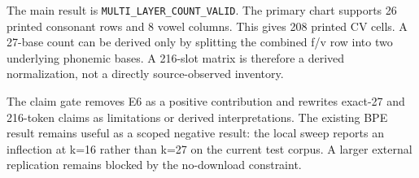 



The main result is \texttt{MULTI\_LAYER\_COUNT\_VALID}. The primary chart supports 26 printed consonant rows and 8 vowel columns. This gives 208 printed CV cells. A 27-base count can be derived only by splitting the combined f/v row into two underlying phonemic bases. A 216-slot matrix is therefore a derived normalization, not a directly source-observed inventory.

The claim gate removes E6 as a positive contribution and rewrites exact-27 and 216-token claims as limitations or derived interpretations. The existing BPE result remains useful as a scoped negative result: the local sweep reports an inflection at k=16 rather than k=27 on the current test corpus. A larger external replication remains blocked by the no-download constraint.
